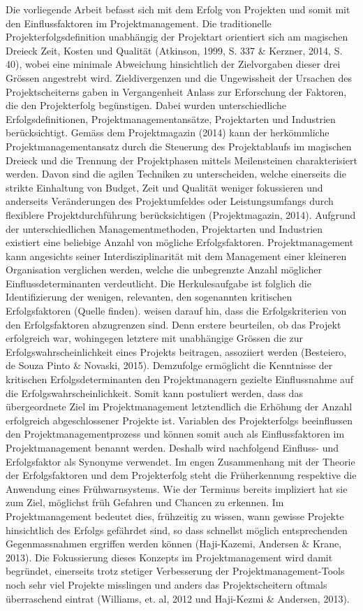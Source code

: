  Die vorliegende Arbeit befasst sich mit dem Erfolg von Projekten und somit mit den Einflussfaktoren im Projektmanagement. Die traditionelle Projekterfolgsdefinition unabhängig der Projektart orientiert sich am magischen Dreieck Zeit, Kosten und Qualität (Atkinson, 1999, S. 337 \& Kerzner, 2014, S. 40), wobei eine minimale Abweichung hinsichtlich der Zielvorgaben dieser drei Grössen angestrebt wird. Zieldivergenzen und die Ungewissheit der Ursachen des Projektscheiterns gaben in Vergangenheit Anlass zur Erforschung der Faktoren, die den Projekterfolg begünstigen. Dabei wurden unterschiedliche Erfolgsdefinitionen, Projektmanagementansätze, Projektarten und Industrien berücksichtigt. Gemäss dem Projektmagazin (2014) kann der herkömmliche Projektmanagementansatz durch die Steuerung des Projektablaufs im magischen Dreieck und die Trennung der Projektphasen mittels Meilensteinen charakterisiert werden. Davon sind die agilen Techniken zu unterscheiden, welche einerseits die strikte Einhaltung von Budget, Zeit und Qualität weniger fokussieren und anderseits Veränderungen des Projektumfeldes oder Leistungsumfangs durch flexiblere Projektdurchführung berücksichtigen (Projektmagazin, 2014). Aufgrund der unterschiedlichen Managementmethoden, Projektarten und Industrien existiert eine beliebige Anzahl von mögliche Erfolgsfaktoren. Projektmanagement kann angesichts seiner Interdisziplinarität mit dem Management einer kleineren Organisation verglichen werden, welche die unbegrenzte Anzahl möglicher Einflussdeterminanten verdeutlicht. Die Herkulesaufgabe ist folglich die Identifizierung der wenigen, relevanten, den sogenannten kritischen Erfolgsfaktoren (Quelle finden). \cite{Besteiro2015} weisen darauf hin, dass die Erfolgskriterien von den Erfolgsfaktoren abzugrenzen sind. Denn erstere beurteilen, ob das Projekt erfolgreich war, wohingegen letztere mit unabhängige Grössen die zur Erfolgswahrscheinlichkeit eines Projekts beitragen, assoziiert werden (Besteiero, de Souza Pinto \& Novaski, 2015). Demzufolge ermöglicht die Kenntnisse der kritischen Erfolgsdeterminanten den Projektmanagern gezielte Einflussnahme auf die Erfolgswahrscheinlichkeit. Somit kann postuliert werden, dass das übergeordnete Ziel im Projektmanagement letztendlich die Erhöhung der Anzahl erfolgreich abgeschlossener Projekte ist. Variablen des Projekterfolgs beeinflussen den Projektmanagementprozess und können somit auch als Einflussfaktoren im Projektmanagement benannt werden. Deshalb wird nachfolgend Einfluss- und Erfolgsfaktor als Synonyme verwendet. Im engen Zusammenhang mit der Theorie der Erfolgsfaktoren und dem Projekterfolg steht die Früherkennung respektive die Anwendung eines Frühwarnsystems. Wie der Terminus bereits impliziert hat sie zum Ziel, möglichst früh Gefahren und Chancen zu erkennen. Im Projektmanagement bedeutet dies, frühzeitig zu wissen, wann gewisse Projekte hinsichtlich des Erfolgs gefährdet sind, so dass schnellst möglich entsprechenden Gegenmassnahmen ergriffen werden können (Haji-Kazemi, Andersen \& Krane, 2013). Die Fokussierung dieses Konzepts im Projektmanagement wird damit begründet, einerseits trotz stetiger Verbesserung der Projektmanagement-Tools noch sehr viel Projekte misslingen und anders das Projektscheitern oftmals überraschend eintrat (Williams, et. al, 2012 und Haji-Kezmi \& Andersen, 2013). 
